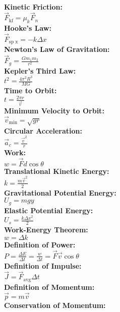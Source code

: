 \documentclass[12pt]{article}
\begin{document}
\\ \textbf{Kinetic Friction:}
    \\ \( \vec{ F }_{\text{kf}} = \mu_k \vec{ F }_n \)
\\ \textbf{Hooke's Law:}
    \\ \( \vec{ F }_{\text{sp x}} = -k \Delta x \)
\\ \textbf{Newton's Law of Gravitation:}
    \\ \( \vec{ F }_g = \displaystyle\frac{ G m_1 m_2 }{ r^2 } \)
\\ \textbf{Kepler's Third Law:}
    \\ \( t^2 = \displaystyle\frac{ 4 \pi^2 R^3 }{ MG } \)
\\ \textbf{Time to Orbit:}
    \\ \( t = \displaystyle\frac{ 2 \pi r }{ \vec{ v } } \)
\\ \textbf{Minimum Velocity to Orbit:}
    \\ \( \vec{ v }_{\text{min}} = \sqrt{ gr } \)
\\ \textbf{Circular Acceleration:}
    \\ \( \vec{ a }_c = \displaystyle\frac{ \vec{ v }^2 }{ r } \)
\\ \textbf{Work:}
    \\ \( w = \vec{ F }d \cos \theta \)
\\ \textbf{Translational Kinetic Energy:}
    \\ \( k = \displaystyle\frac{ m\vec{ v }^2 }{ 2 } \)
\\ \textbf{Gravitational Potential Energy:}
    \\ \( U_g = mgy \)
\\ \textbf{Elastic Potential Energy:}
    \\ \( U_s = \displaystyle\frac{ k \Delta x^2 }{ 2 } \)
\\ \textbf{Work-Energy Theorem:}
    \\ \( w = \Delta k \)
\\ \textbf{Definition of Power:}
    \\ \( P = \displaystyle\frac{ \Delta E }{ \Delta t } = \displaystyle\frac{ w }{ \Delta t } = \vec{ F } \vec{ v } \cos \theta \)
\\ \textbf{Definition of Impulse:}
    \\ \( \vec{ J } = \vec{ F }_{\text{avg}} \Delta t \)
\\ \textbf{Definition of Momentum:}
    \\ \( \vec{ p } = m\vec{ v } \)
\\ \textbf{Conservation of Momentum:}
\end{document}

